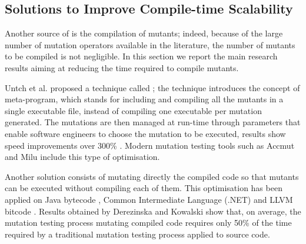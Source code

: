 
\subsection{Solutions to Improve Compile-time Scalability}
\label{sub:compileTime}
\label{sec:opt:selection}

Another source of  is the compilation of mutants;
indeed, because of the large number of mutation operators available in the literature, the number of mutants to be compiled is not negligible. In this section we report the main research results aiming at reducing the time required to compile mutants.

Untch et al. \cite{untch1993mutation} proposed a technique called ; the technique introduces the concept of meta-program, which stands for including and compiling all the mutants in a single executable file, instead of compiling one executable per mutation generated. The mutations are then managed at run-time through parameters that enable software engineers to choose the mutation to be executed, results show speed improvements over 300\% \cite{untch1993mutation,papadakis2010automatic}. Modern mutation testing tools such as Accmut \cite{wang2017faster} and Milu \cite{jia2008milu} include this type of optimisation.

Another solution consists of mutating directly the compiled code so that mutants can be executed without compiling each of them.
This optimisation has been applied on Java bytecode \cite{ma2006mujava}, Common Intermediate Language (.NET) \cite{derezinska2011object} and LLVM bitcode \cite{hariri2016evaluating}. Results obtained by Derezinska and Kowalski \cite{derezinska2011object} show that, on average, 
the mutation testing process mutating compiled code requires only 50\% of the time required by a traditional mutation testing process applied to source code.
